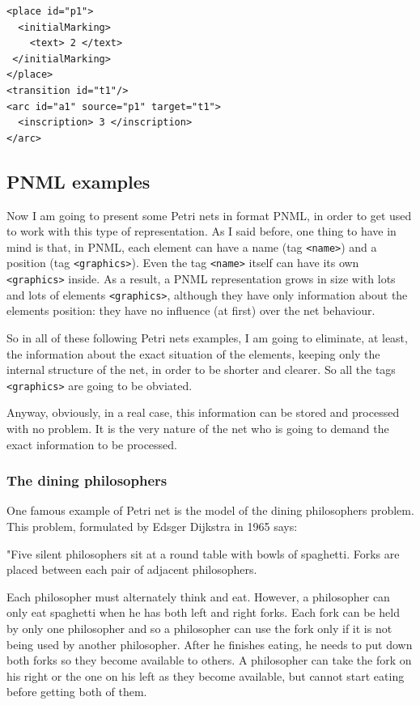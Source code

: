 \begin{lstlisting}[label=pnml_simplified_representation,caption=Simplified PNML representation
for a basic Petri net]
<place id="p1">
  <initialMarking>
    <text> 2 </text>
 </initialMarking>
</place>
<transition id="t1"/>
<arc id="a1" source="p1" target="t1">
  <inscription> 3 </inscription>
</arc>
\end{lstlisting}








\subsection{PNML examples}

Now I am going to present some Petri nets in format PNML, in order to get
used to work with this type of representation. As I said before, one thing to have in mind
is that, in PNML, each element can have a name (tag \texttt{<name>}) and a position
(tag \texttt{<graphics>}).  Even the
tag \texttt{<name>} itself can have its own \texttt{<graphics>} inside. As
a result, a PNML representation grows in size with lots and lots of elements
\texttt{<graphics>}, although they have only information about the elements
position: they have no influence (at first) over the net behaviour.

So in all of these following Petri nets examples,
I am going to eliminate, at least, the information about the exact situation of the elements, keeping only the internal structure of the net,
in order to be shorter and clearer. So all the tags \texttt{<graphics>} are going to
be obviated.

Anyway, obviously, in a real case, this information can be stored and processed
with no problem. It is the very nature of the net who is going to demand the exact information to be processed. 

\subsubsection{The dining philosophers}

One famous example of Petri net is the model of the dining philosophers
problem.
This problem, formulated by Edsger Dijkstra in 1965 says:

"Five silent philosophers sit at a round table with bowls of spaghetti. Forks are placed between each pair of adjacent philosophers.

Each philosopher must alternately think and eat. However, a philosopher can only eat spaghetti when he has both left and right forks. Each fork can be held by only one philosopher and so a philosopher can use the fork only if it is not being used by another philosopher. After he finishes eating, he needs to put down both forks so they become available to others. A philosopher can take the fork on his right or the one on his left as they become available, but cannot start eating before getting both of them.

